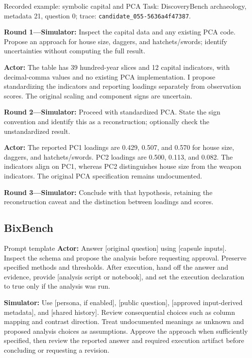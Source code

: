 \begin{promptframe}{Recorded example: symbolic capital and PCA}
Task: DiscoveryBench archaeology, metadata 21, question 0;
trace: \texttt{candidate\_055-5636a4f47387}.
\par\smallskip
\textbf{Round 1---Simulator:} Inspect the capital data and any existing PCA
code. Propose an approach for house size, daggers, and hatchets/swords;
identify uncertainties without computing the full result.\par
\textbf{Actor:} The table has 39 hundred-year slices and 12 capital indicators,
with decimal-comma values and no existing PCA implementation. I propose
standardizing the indicators and reporting loadings separately from
observation scores. The original scaling and component signs are uncertain.\par
\textbf{Round 2---Simulator:} Proceed with standardized PCA. State the sign
convention and identify this as a reconstruction; optionally check the
unstandardized result.\par
\textbf{Actor:} The reported PC1 loadings are 0.429, 0.507, and 0.570 for house
size, daggers, and hatchets/swords. PC2 loadings are 0.500, 0.113, and 0.082.
The indicators align on PC1, whereas PC2 distinguishes house size from the
weapon indicators. The original PCA specification remains undocumented.\par
\textbf{Round 3---Simulator:} Conclude with that hypothesis, retaining the
reconstruction caveat and the distinction between loadings and scores.
\end{promptframe}

\subsection{BixBench}
\label{app:prompts-bixbench}
\begin{promptframe}{Prompt template}
\textbf{Actor:} Answer [original question] using [capsule inputs]. Inspect
the schema and propose the analysis before requesting approval. Preserve
specified methods and thresholds. After execution, hand off the answer and
evidence, provide [analysis script or notebook], and set the execution
declaration to true only if the analysis was run.\par
\textbf{Simulator:} Use [persona, if enabled], [public question], [approved
input-derived metadata], and [shared history]. Review consequential choices
such as column mapping and contrast direction. Treat undocumented meanings
as unknown and proposed analysis choices as assumptions. Approve the
approach when sufficiently specified, then review the reported answer and
required execution artifact before concluding or requesting a revision.
\end{promptframe}

